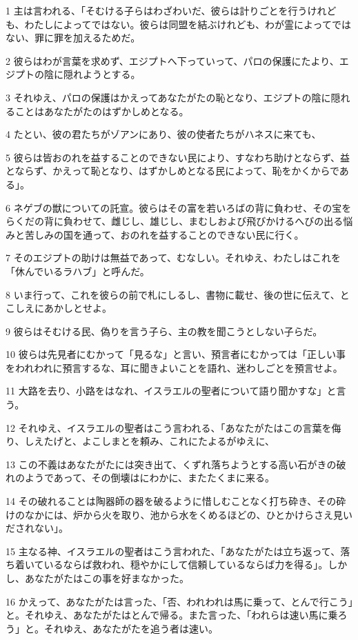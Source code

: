 \par 1 主は言われる、「そむける子らはわざわいだ、彼らは計りごとを行うけれども、わたしによってではない。彼らは同盟を結ぶけれども、わが霊によってではない、罪に罪を加えるためだ。
\par 2 彼らはわが言葉を求めず、エジプトへ下っていって、パロの保護にたより、エジプトの陰に隠れようとする。
\par 3 それゆえ、パロの保護はかえってあなたがたの恥となり、エジプトの陰に隠れることはあなたがたのはずかしめとなる。
\par 4 たとい、彼の君たちがゾアンにあり、彼の使者たちがハネスに来ても、
\par 5 彼らは皆おのれを益することのできない民により、すなわち助けとならず、益とならず、かえって恥となり、はずかしめとなる民によって、恥をかくからである」。
\par 6 ネゲブの獣についての託宣。彼らはその富を若いろばの背に負わせ、その宝をらくだの背に負わせて、雌じし、雄じし、まむしおよび飛びかけるへびの出る悩みと苦しみの国を通って、おのれを益することのできない民に行く。
\par 7 そのエジプトの助けは無益であって、むなしい。それゆえ、わたしはこれを「休んでいるラハブ」と呼んだ。
\par 8 いま行って、これを彼らの前で札にしるし、書物に載せ、後の世に伝えて、とこしえにあかしとせよ。
\par 9 彼らはそむける民、偽りを言う子ら、主の教を聞こうとしない子らだ。
\par 10 彼らは先見者にむかって「見るな」と言い、預言者にむかっては「正しい事をわれわれに預言するな、耳に聞きよいことを語れ、迷わしごとを預言せよ。
\par 11 大路を去り、小路をはなれ、イスラエルの聖者について語り聞かすな」と言う。
\par 12 それゆえ、イスラエルの聖者はこう言われる、「あなたがたはこの言葉を侮り、しえたげと、よこしまとを頼み、これにたよるがゆえに、
\par 13 この不義はあなたがたには突き出て、くずれ落ちようとする高い石がきの破れのようであって、その倒壊はにわかに、またたくまに来る。
\par 14 その破れることは陶器師の器を破るように惜しむことなく打ち砕き、その砕けのなかには、炉から火を取り、池から水をくめるほどの、ひとかけらさえ見いだされない」。
\par 15 主なる神、イスラエルの聖者はこう言われた、「あなたがたは立ち返って、落ち着いているならば救われ、穏やかにして信頼しているならば力を得る」。しかし、あなたがたはこの事を好まなかった。
\par 16 かえって、あなたがたは言った、「否、われわれは馬に乗って、とんで行こう」と。それゆえ、あなたがたはとんで帰る。また言った、「われらは速い馬に乗ろう」と。それゆえ、あなたがたを追う者は速い。
